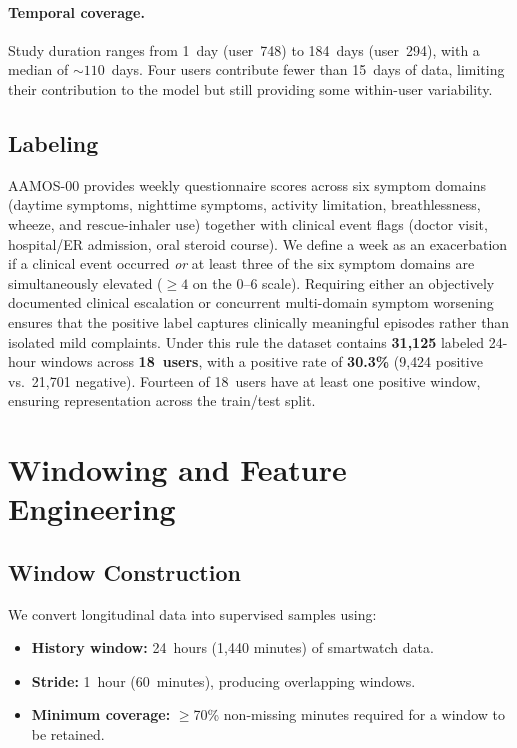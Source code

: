 \documentclass[11pt,a4paper]{article}
\begin{document}
\paragraph{Temporal coverage.}
Study duration ranges from 1~day (user~748) to 184~days (user~294), with a
median of ${\sim}110$~days.  Four users contribute fewer than 15~days of data,
limiting their contribution to the model but still providing some within-user
variability.

\subsection{Labeling}

AAMOS-00 provides weekly questionnaire scores across six symptom domains
(daytime symptoms, nighttime symptoms, activity limitation, breathlessness,
wheeze, and rescue-inhaler use) together with clinical event flags (doctor
visit, hospital/ER admission, oral steroid course).  We define a week as
an exacerbation if a clinical event occurred \emph{or} at least three of
the six symptom domains are simultaneously elevated ($\geq 4$ on the 0--6
scale).  Requiring either an objectively documented clinical escalation or
concurrent multi-domain symptom worsening ensures that the positive label
captures clinically meaningful episodes rather than isolated mild complaints.
Under this rule the dataset contains \textbf{31{,}125} labeled 24-hour
windows across \textbf{18~users}, with a positive rate of
\textbf{30.3\%} (9{,}424 positive vs.\ 21{,}701 negative).  Fourteen of
18~users have at least one positive window, ensuring representation across
the train/test split.

\section{Windowing and Feature Engineering}\label{sec:features}

\subsection{Window Construction}

We convert longitudinal data into supervised samples using:
\begin{itemize}[nosep]
  \item \textbf{History window:} 24~hours (1{,}440 minutes) of smartwatch data.
  \item \textbf{Stride:} 1~hour (60~minutes), producing overlapping windows.
  \item \textbf{Minimum coverage:} $\geq$70\% non-missing minutes required for
        a window to be retained.
\end{itemize}
\end{document}
